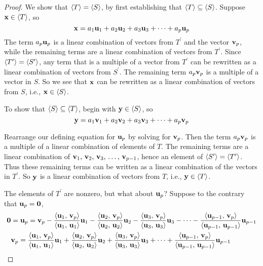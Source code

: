 \documentclass{ximera}
\begin{document}
\begin{theorem}
\begin{proof}
    We show that $\left\langle T\right\rangle=\left\langle S\right\rangle$, by first establishing that
    $\left\langle T\right\rangle\subseteq\left\langle S\right\rangle$.  Suppose $\mathbf{x}\in\left\langle T\right\rangle$, so
    \[
      \mathbf{x}=a_{1}\mathbf{u}_{1}+a_{2}\mathbf{u}_{2}+a_{3}\mathbf{u}_{3}+\cdots +a_{p}\mathbf{u}_{p}
    \]
    The term $a_p\mathbf{u}_p$ is a linear combination of vectors from
    $T^\prime$ and the vector $\mathbf{v}_p$, while the remaining terms
    are a linear combination of vectors from $T^\prime$.  Since
    $\left\langle T^\prime\right\rangle=\left\langle S^\prime\right\rangle$, any term that is a multiple of a
    vector from $T^\prime$ can be rewritten as a linear combination of
    vectors from $S^\prime$.  The remaining term $a_p\mathbf{v}_p$ is a
    multiple of a vector in $S$.  So we see that $\mathbf{x}$ can be
    rewritten as a linear combination of vectors from $S$, i.e.,
    $\mathbf{x}\in\left\langle S\right\rangle$.

    To show that $\left\langle S\right\rangle\subseteq\left\langle T\right\rangle$, begin with
    $\mathbf{y}\in\left\langle S\right\rangle$, so
    \[
      \mathbf{y}=a_{1}\mathbf{v}_{1}+a_{2}\mathbf{v}_{2}+a_{3}\mathbf{v}_{3}+\cdots +a_{p}\mathbf{v}_{p}
    \]

    Rearrange our defining equation for $\mathbf{u}_p$ by solving for
    $\mathbf{v}_p$.  Then the term $a_p\mathbf{v}_p$ is a multiple of a
    linear combination of elements of $T$.  The remaining terms are a
    linear combination of $\mathbf{v}_{1},\,\mathbf{v}_{2},\,\mathbf{v}_{3},\,\ldots,\,\mathbf{v}_{p-1}$, hence an element of
    $\left\langle S^\prime\right\rangle=\left\langle T^\prime\right\rangle$.  Thus these remaining terms can
    be written as a linear combination of the vectors in $T^\prime$.
    So $\mathbf{y}$ is a linear combination of vectors from $T$, i.e.,
    $\mathbf{y}\in\left\langle T\right\rangle$.


    The elements of $T^\prime$ are nonzero, but what about
    $\mathbf{u}_p$?  Suppose to the contrary that
    $\mathbf{u}_p=\mathbf{0}$,
    \begin{align*}
      \mathbf{0}&=\mathbf{u}_p=\mathbf{v}_p
                   -\frac{\left\langle\mathbf{u}_1,\,\mathbf{v}_p\right\rangle}{\left\langle\mathbf{u}_1,\,\mathbf{u}_1\right\rangle}\mathbf{u}_1
                   -\frac{\left\langle\mathbf{u}_2,\,\mathbf{v}_p\right\rangle}{\left\langle\mathbf{u}_2,\,\mathbf{u}_2\right\rangle}\mathbf{u}_2
                   -\frac{\left\langle\mathbf{u}_3,\,\mathbf{v}_p\right\rangle}{\left\langle\mathbf{u}_3,\,\mathbf{u}_3\right\rangle}\mathbf{u}_3
                   -\cdots
                   -\frac{\left\langle\mathbf{u}_{p-1},\,\mathbf{v}_p\right\rangle}{\left\langle\mathbf{u}_{p-1},\,\mathbf{u}_{p-1}\right\rangle}\mathbf{u}_{p-1}\\
                 &\mathbf{v}_p=
                   \frac{\left\langle\mathbf{u}_1,\,\mathbf{v}_p\right\rangle}{\left\langle\mathbf{u}_1,\,\mathbf{u}_1\right\rangle}\mathbf{u}_1
                   +\frac{\left\langle\mathbf{u}_2,\,\mathbf{v}_p\right\rangle}{\left\langle\mathbf{u}_2,\,\mathbf{u}_2\right\rangle}\mathbf{u}_2
                   +\frac{\left\langle\mathbf{u}_3,\,\mathbf{v}_p\right\rangle}{\left\langle\mathbf{u}_3,\,\mathbf{u}_3\right\rangle}\mathbf{u}_3
                   +\cdots
                   +\frac{\left\langle\mathbf{u}_{p-1},\,\mathbf{v}_p\right\rangle}{\left\langle\mathbf{u}_{p-1},\,\mathbf{u}_{p-1}\right\rangle}\mathbf{u}_{p-1}
    \end{align*}


\end{proof}
\end{theorem}
\end{document}
